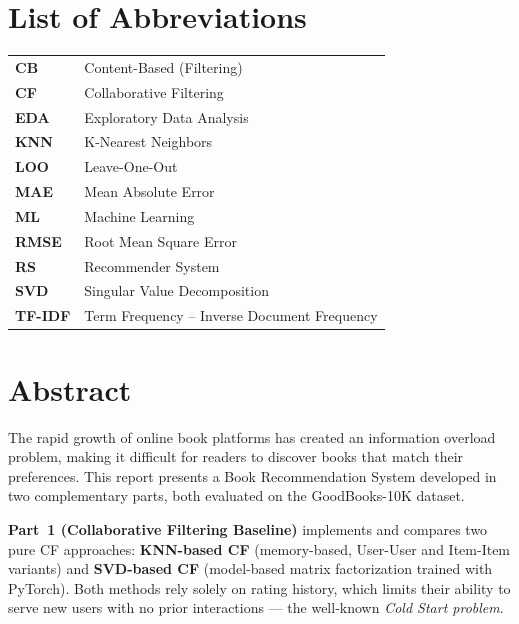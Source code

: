 \documentclass[12pt, a4paper]{article}
\begin{document}
\newpage
\thispagestyle{fancy}
\section*{List of Abbreviations}

\begin{tabular}{@{}ll@{}}
  \textbf{CB}   & Content-Based (Filtering) \\
  \textbf{CF}   & Collaborative Filtering \\
  \textbf{EDA}  & Exploratory Data Analysis \\
  \textbf{KNN}  & K-Nearest Neighbors \\
  \textbf{LOO}  & Leave-One-Out \\
  \textbf{MAE}  & Mean Absolute Error \\
  \textbf{ML}   & Machine Learning \\
  \textbf{RMSE} & Root Mean Square Error \\
  \textbf{RS}   & Recommender System \\
  \textbf{SVD}  & Singular Value Decomposition \\
  \textbf{TF-IDF} & Term Frequency -- Inverse Document Frequency \\
\end{tabular}

\newpage
\thispagestyle{fancy}
\section*{Abstract}

The rapid growth of online book platforms has created an information overload problem,
making it difficult for readers to discover books that match their preferences.
This report presents a Book Recommendation System developed in two complementary parts,
both evaluated on the GoodBooks-10K dataset.

\textbf{Part~1 (Collaborative Filtering Baseline)} implements and compares two pure CF approaches:
\textbf{KNN-based CF} (memory-based, User-User and Item-Item variants) and
\textbf{SVD-based CF} (model-based matrix factorization trained with PyTorch).
Both methods rely solely on rating history, which limits their ability to serve
new users with no prior interactions --- the well-known \textit{Cold Start problem}.
\end{document}
